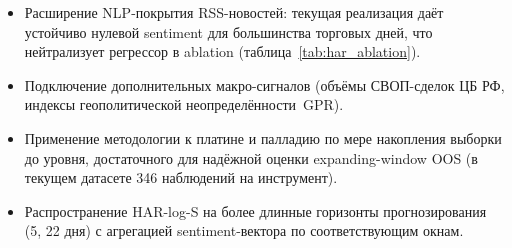 \begin{itemize}
    \item Расширение NLP-покрытия RSS-новостей: текущая реализация
          даёт устойчиво нулевой sentiment для большинства торговых дней,
          что нейтрализует регрессор в ablation
          (таблица~\ref{tab:har_ablation}).
    \item Подключение дополнительных макро-сигналов
          (объёмы СВОП-сделок ЦБ РФ, индексы геополитической
          неопределённости~GPR).
    \item Применение методологии к платине и палладию по мере
          накопления выборки до уровня, достаточного для
          надёжной оценки expanding-window OOS
          (в текущем датасете 346 наблюдений на инструмент).
    \item Распространение HAR-log-S на более длинные горизонты
          прогнозирования (5, 22 дня) с агрегацией sentiment-вектора
          по соответствующим окнам.
\end{itemize}
